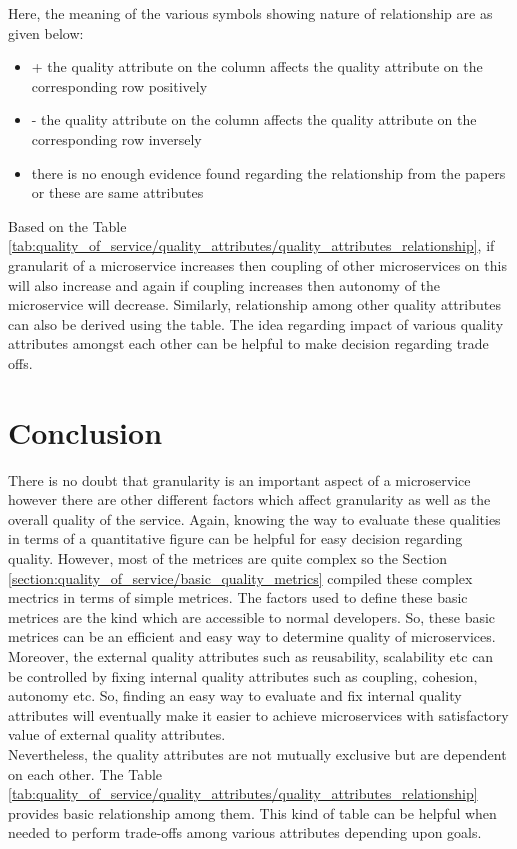 {{{{{{{{{{Here, the meaning of the various symbols showing nature of relationship are as given below:
  \\
\begin{itemize}[leftmargin=.5in]
\item + the quality attribute on the column affects the quality attribute on the corresponding row positively
\item - the quality attribute on the column affects the quality attribute on the corresponding row inversely
\item   there is no enough evidence found regarding the relationship from the papers or these are same attributes
\end{itemize}
Based on the Table \ref{tab:quality_of_service/quality_attributes/quality_attributes_relationship}, if granularit of a microservice increases then coupling of other microservices on this will also increase and again if coupling increases then autonomy of the microservice will decrease. Similarly, relationship among other quality attributes can also be derived using the table.
The idea regarding impact of various quality attributes amongst each other can be helpful to make decision regarding trade offs.

\section{Conclusion}\label{section:quality_of_service/conclusion}
There is no doubt that granularity is an important aspect of a microservice however there are other different factors which affect granularity as well as the overall quality of the service. Again, knowing the way to evaluate these qualities in terms of a quantitative figure can be helpful for easy decision regarding quality. However, most of the metrices are quite complex so the Section \ref{section:quality_of_service/basic_quality_metrics} compiled these complex mectrics in terms of simple metrices. The factors used to define these basic metrices are the kind which are accessible to normal developers. So, these basic metrices can be an efficient and easy way to determine quality of microservices. \\
Moreover, the external quality attributes such as reusability, scalability etc can be controlled by fixing internal quality attributes such as coupling, cohesion, autonomy etc. So, finding an easy way to evaluate and fix internal quality attributes will eventually make it easier to achieve microservices with satisfactory value of external quality attributes.\\
Nevertheless, the quality attributes are not mutually exclusive but are dependent on each other. The Table \ref{tab:quality_of_service/quality_attributes/quality_attributes_relationship} provides basic relationship among them. This kind of table can be helpful when needed to perform trade-offs among various attributes depending upon goals.
}}}}}}}}}}
